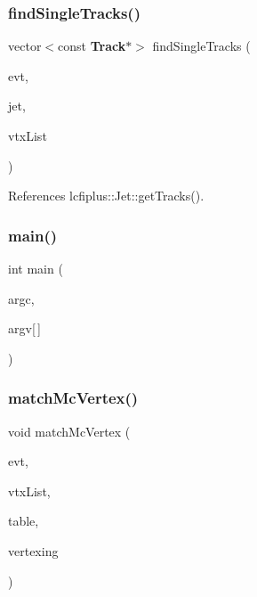 \mbox{\label{Driver_8cc_a5da686d98fbf637efb93f6c631041782}} 
\subsubsection{find\+Single\+Tracks()}
{\footnotesize\ttfamily vector$<$const \textbf{ Track}$\ast$$>$ find\+Single\+Tracks (\begin{DoxyParamCaption}\item[{const \textbf{ Event} \&}]{evt,  }\item[{const \textbf{ Jet} \&}]{jet,  }\item[{const vector$<$ \textbf{ lcfiplus\+::\+Vertex} $\ast$$>$ \&}]{vtx\+List }\end{DoxyParamCaption})}



References lcfiplus\+::\+Jet\+::get\+Tracks().

\mbox{\label{Driver_8cc_a0ddf1224851353fc92bfbff6f499fa97}} 
\subsubsection{main()}
{\footnotesize\ttfamily int main (\begin{DoxyParamCaption}\item[{int}]{argc,  }\item[{char $\ast$}]{argv[$\,$] }\end{DoxyParamCaption})}

\mbox{\label{Driver_8cc_a9fbe055d9c97753d246acc7bc6061af8}} 
\subsubsection{match\+Mc\+Vertex()}
{\footnotesize\ttfamily void match\+Mc\+Vertex (\begin{DoxyParamCaption}\item[{const \textbf{ Event} \&}]{evt,  }\item[{vector$<$ \textbf{ M\+C\+Vertex} $\ast$$>$ \&}]{vtx\+List,  }\item[{map$<$ \textbf{ M\+C\+Vertex} $\ast$, int $>$ \&}]{table,  }\item[{bool}]{vertexing }\end{DoxyParamCaption})}



